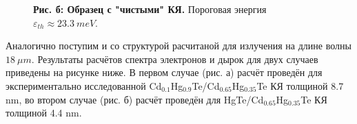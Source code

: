\documentclass[../main.tex]{subfiles}
\begin{document}
\begin{figure}[h!]
\begin{minipage}[h]{0.49\linewidth}
\begin{center}
                    \textbf{Рис. б: Образец с "чистыми" КЯ.} Пороговая энергия 
                        $\varepsilon_{th} \approx 23.3~meV$.
                \end{center}
            \end{minipage}
        \end{figure}
        
        Аналогично поступим и со структурой расчитаной для излучения на длине волны  
        $18~\mu m$. Результаты расчётов спектра электронов и дырок для двух случаев приведены на рисунке ниже. В первом случае (рис. а) расчёт проведён 
        для экспериментально исследованной Cd${}_{0.1}$Hg${}_{0.9}$Te/Cd${}_{0.65}$Hg${}_{0.35}$Te КЯ толщиной 8.7 nm, во втором случае (рис. б) расчёт проведён для 
        HgTe/Cd${}_{0.65}$Hg${}_{0.35}$Te КЯ толщиной 4.4 nm.
        
\end{document}
